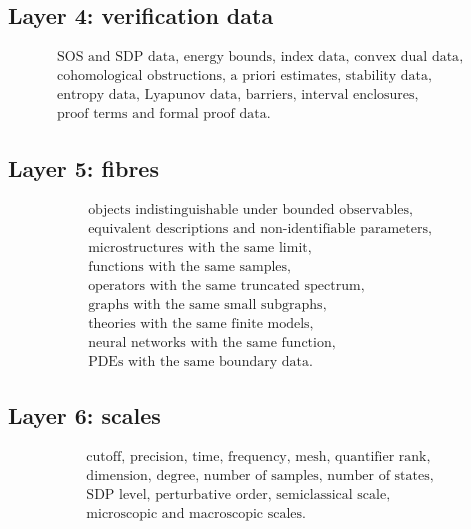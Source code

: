 \documentclass[11pt]{article}
\begin{document}
\subsection{Layer 4: verification data}

\[
\begin{gathered}
\text{SOS and SDP data, energy bounds, index data, convex dual data},\\
\text{cohomological obstructions, a priori estimates, stability data},\\
\text{entropy data, Lyapunov data, barriers, interval enclosures},\\
\text{proof terms and formal proof data}.
\end{gathered}
\]

\subsection{Layer 5: fibres}

\[
\begin{gathered}
\text{objects indistinguishable under bounded observables},\\
\text{equivalent descriptions and non-identifiable parameters},\\
\text{microstructures with the same limit},\\
\text{functions with the same samples},\\
\text{operators with the same truncated spectrum},\\
\text{graphs with the same small subgraphs},\\
\text{theories with the same finite models},\\
\text{neural networks with the same function},\\
\text{PDEs with the same boundary data}.
\end{gathered}
\]

\subsection{Layer 6: scales}

\[
\begin{gathered}
\text{cutoff, precision, time, frequency, mesh, quantifier rank},\\
\text{dimension, degree, number of samples, number of states},\\
\text{SDP level, perturbative order, semiclassical scale},\\
\text{microscopic and macroscopic scales}.
\end{gathered}
\]
\end{document}

